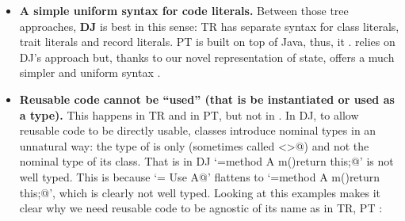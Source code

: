 \begin{itemize}
\item {\bf A simple uniform syntax for code literals.}
Between those tree approaches, \textbf{DJ} is best in this sense: TR has separate syntax for class literals, trait literals and record literals.
PT is built on top of Java, thus, it .
\MS{\name} relies on DJ's approach but,
thanks to our novel representation of state, \name offers a much simpler and uniform syntax .
\item 
{\bf Reusable code cannot be ``used'' (that is be instantiated or used as a type).}
This happens in TR and in PT, but not in . In DJ, to allow reusable code to be directly 
usable, 
classes introduce nominal types in an unnatural way: the type of
\Q@this@ is only \Q@This@ (sometimes called \Q@<>@) and not the
nominal type of its class. 
That is in DJ 
`\Q@A={method A m(){return this;}}@' is not well typed. This is because
`\Q@B= Use A@' flattens to `\Q@B={method A m(){return this;}}@', which is clearly not well typed.
Looking at this examples makes it clear
 why we need reusable code to be agnostic of its name as in  TR, PT :


\end{itemize}

